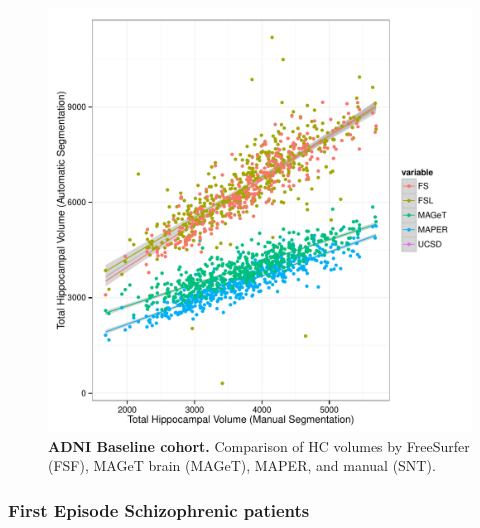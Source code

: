 \documentclass{article}\usepackage{graphicx, color}
\makeatletter
\def\maxwidth{ %
  \ifdim\Gin@nat@width>\linewidth
    \linewidth
  \else
    \Gin@nat@width
  \fi
}
\newenvironment{knitrout}{}{} %
\makeatother
\begin{document}
\begin{figure}[h]
\begin{knitrout}
\color{fgcolor}

{\centering \includegraphics[width=\maxwidth]{figure/ADNI-baseline-volumes-plot} 

}


\end{knitrout}

  \caption{{\bf ADNI Baseline cohort.} Comparison of HC volumes by FreeSurfer (FSF), MAGeT brain (MAGeT), MAPER, and manual (SNT).}
  \label{ADNI-baseline-volumes-plot}
\end{figure}

\subsubsection{First Episode Schizophrenic patients}
\end{document}
